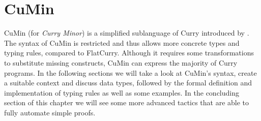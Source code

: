 \documentclass[paper = a4, fleqn, twoside]{scrreprt}
\begin{document}
\chapter{CuMin}
\label{cumin}
CuMin (for \textit{Curry Minor}) is a simplified sublanguage of Curry introduced by \citet{p19mehner}. The syntax of CuMin is restricted and thus allows more concrete types and typing rules, compared to FlatCurry. Although it requires some transformations to substitute missing constructs, CuMin can express the majority of Curry programs. In the following sections we will take a look at CuMin's syntax, create a suitable context and discuss data types, followed by the formal definition and implementation of typing rules as well as some examples. In the concluding section of this chapter we will see some more advanced tactics that are able to fully automate simple proofs.
\end{document}
